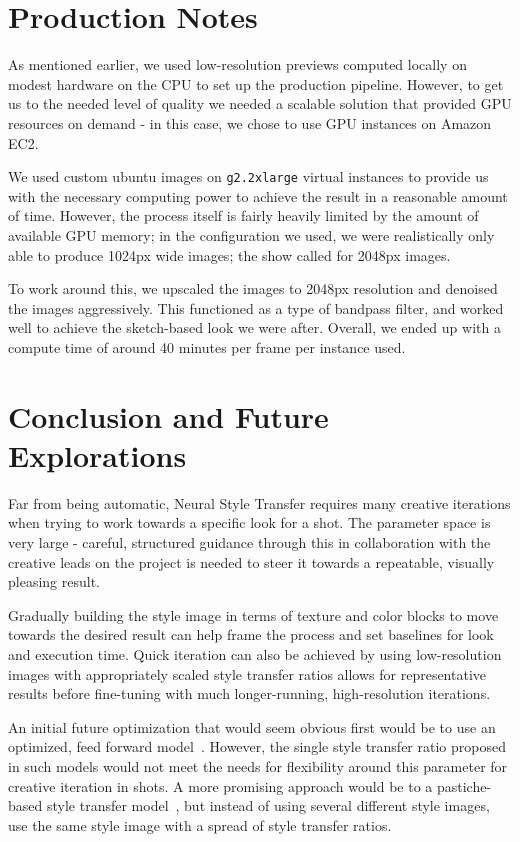 \documentclass{acmsiggraph}
\begin{document}
\section{Production Notes}
As mentioned earlier, we used low-resolution previews computed locally on modest hardware on the CPU to set up the production pipeline. However, to get us to the needed level of quality we needed a scalable solution that provided GPU resources on demand - in this case, we chose to use GPU instances on Amazon EC2.

We used custom ubuntu images on \texttt{g2.2xlarge} virtual instances to provide us with the necessary computing power to achieve the result in a reasonable amount of time. However, the process itself is fairly heavily limited by the amount of available GPU memory; in the configuration we used, we were realistically only able to produce 1024px wide images; the show called for 2048px images.

To work around this, we upscaled the images to 2048px resolution and denoised the images aggressively. This functioned as a type of bandpass filter, and worked well to achieve the sketch-based look we were after. Overall, we ended up with a compute time of around 40 minutes per frame per instance used.

\section{Conclusion and Future Explorations}
Far from being automatic, Neural Style Transfer requires many creative iterations when trying to work towards a specific look for a shot. The parameter space is very large - careful, structured guidance through this in collaboration with the creative leads on the project is needed to steer it towards a repeatable, visually pleasing result.

Gradually building the style image in terms of texture and color blocks to move towards the desired result can help frame the process and set baselines for look and execution time. Quick iteration can also be achieved by using low-resolution images with appropriately scaled style transfer ratios allows for representative results before fine-tuning with much longer-running, high-resolution iterations.

An initial future optimization that would seem obvious first would be to use an optimized, feed forward model~\cite{ulyanov:2016}. However, the single style transfer ratio proposed in such models would not meet the needs for flexibility around this parameter for creative iteration in shots. A more promising approach would be to a pastiche-based style transfer model~\cite{dumoulin:2016}, but instead of using several different style images, use the same style image with a spread of style transfer ratios.


\nocite{*}

\end{document}
